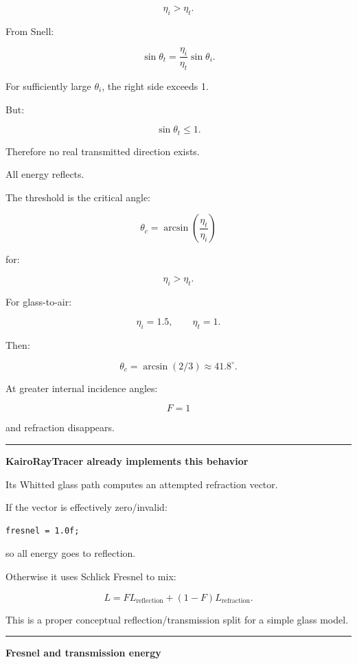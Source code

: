 \[
\eta_i>\eta_t.
\]

From Snell:

\[
\sin\theta_t
=
\frac{\eta_i}{\eta_t}
\sin\theta_i.
\]

For sufficiently large \(\theta_i\), the right side exceeds 1.

But:

\[
\sin\theta_t\le1.
\]

Therefore no real transmitted direction exists.

All energy reflects.

The threshold is the critical angle:

\[
\boxed{
\theta_c=
\arcsin
\left(
\frac{\eta_t}{\eta_i}
\right)
}
\]

for:

\[
\eta_i>\eta_t.
\]

For glass-to-air:

\[
\eta_i=1.5,
\qquad
\eta_t=1.
\]

Then:

\[
\theta_c=
\arcsin(2/3)
\approx41.8^\circ.
\]

At greater internal incidence angles:

\[
\boxed{
F=1
}
\]

and refraction disappears.

\begin{center}\rule{0.5\linewidth}{0.5pt}\end{center}

\textbf{KairoRayTracer already implements this behavior}

Its Whitted glass path computes an attempted refraction vector.

If the vector is effectively zero/invalid:

\begin{verbatim}
fresnel = 1.0f;
\end{verbatim}

so all energy goes to reflection.

Otherwise it uses Schlick Fresnel to mix:

\[
L=
F L_{\text{reflection}}
+
(1-F)L_{\text{refraction}}.
\]

This is a proper conceptual reflection/transmission split for a simple glass model.

\begin{center}\rule{0.5\linewidth}{0.5pt}\end{center}

\textbf{Fresnel and transmission energy}

